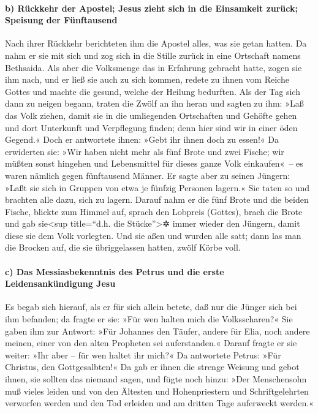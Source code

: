 \hypertarget{b-ruxfcckkehr-der-apostel-jesus-zieht-sich-in-die-einsamkeit-zuruxfcck-speisung-der-fuxfcnftausend}{%
\paragraph{b) Rückkehr der Apostel; Jesus zieht sich in die Einsamkeit
zurück; Speisung der
Fünftausend}\label{b-ruxfcckkehr-der-apostel-jesus-zieht-sich-in-die-einsamkeit-zuruxfcck-speisung-der-fuxfcnftausend}}

 Nach ihrer Rückkehr berichteten ihm die Apostel alles,
was sie getan hatten. Da nahm er sie mit sich und zog sich in die Stille
zurück in eine Ortschaft namens Bethsaida.  Als aber die
Volksmenge das in Erfahrung gebracht hatte, zogen sie ihm nach, und er
ließ sie auch zu sich kommen, redete zu ihnen vom Reiche Gottes und
machte die gesund, welche der Heilung bedurften.  Als der
Tag sich dann zu neigen begann, traten die Zwölf an ihn heran und sagten
zu ihm: »Laß das Volk ziehen, damit sie in die umliegenden Ortschaften
und Gehöfte gehen und dort Unterkunft und Verpflegung finden; denn hier
sind wir in einer öden Gegend.«  Doch er antwortete
ihnen: »Gebt ihr ihnen doch zu essen!« Da erwiderten sie: »Wir haben
nicht mehr als fünf Brote und zwei Fische; wir müßten sonst hingehen und
Lebensmittel für dieses ganze Volk einkaufen«~--  es
waren nämlich gegen fünftausend Männer. Er sagte aber zu seinen Jüngern:
»Laßt sie sich in Gruppen von etwa je fünfzig Personen lagern.«
 Sie taten so und brachten alle dazu, sich zu lagern.
 Darauf nahm er die fünf Brote und die beiden Fische,
blickte zum Himmel auf, sprach den Lobpreis (Gottes), brach die Brote
und gab sie\textless sup title=``d.h. die Stücke''\textgreater✲ immer
wieder den Jüngern, damit diese sie dem Volk vorlegten. 
Und sie aßen und wurden alle satt; dann las man die Brocken auf, die sie
übriggelassen hatten, zwölf Körbe voll.

\hypertarget{c-das-messiasbekenntnis-des-petrus-und-die-erste-leidensankuxfcndigung-jesu}{%
\paragraph{c) Das Messiasbekenntnis des Petrus und die erste
Leidensankündigung
Jesu}\label{c-das-messiasbekenntnis-des-petrus-und-die-erste-leidensankuxfcndigung-jesu}}

 Es begab sich hierauf, als er für sich allein betete,
daß nur die Jünger sich bei ihm befanden; da fragte er sie: »Für wen
halten mich die Volksscharen?«  Sie gaben ihm zur
Antwort: »Für Johannes den Täufer, andere für Elia, noch andere meinen,
einer von den alten Propheten sei auferstanden.«  Darauf
fragte er sie weiter: »Ihr aber -- für wen haltet ihr mich?« Da
antwortete Petrus: »Für Christus, den Gottgesalbten!«  Da
gab er ihnen die strenge Weisung und gebot ihnen, sie sollten das
niemand sagen,  und fügte noch hinzu: »Der Menschensohn
muß vieles leiden und von den Ältesten und Hohenpriestern und
Schriftgelehrten verworfen werden und den Tod erleiden und am dritten
Tage auferweckt werden.«

